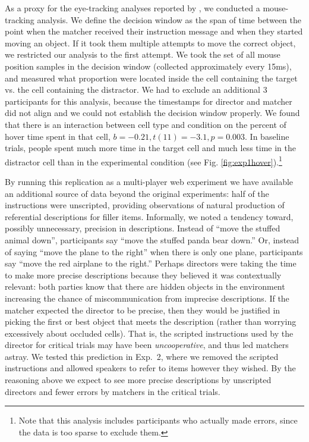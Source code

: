 \documentclass[10pt,letterpaper]{article}
\begin{document}
As a proxy for the eye-tracking analyses reported by , we conducted a mouse-tracking analysis. We define the decision window as the span of time between the point when the matcher received their instruction message and when they started moving an object. If it took them multiple attempts to move the correct object, we restricted our analysis to the first attempt. We took the set of all mouse position samples in the decision window (collected approximately every 15ms), and measured what proportion were located inside the cell containing the target vs. the cell containing the distractor.  We had to exclude an additional 3 participants for this analysis, because the timestamps for director and matcher did not align and we could not establish the decision window properly.
We found that there is an interaction between cell type and condition on the percent of hover time spent in that cell, $b = -0.21, t(11) = -3.1, p = 0.003$. In baseline trials, people spent much more time in the target cell and much less time in the distractor cell than in the experimental condition (see Fig. \ref{fig:exp1hover}).\footnote{Note that this analysis includes participants who actually made errors, since the data is too sparse to exclude them.} %

By running this replication as a multi-player web experiment we have available an additional source of data beyond the original experiments: half of the instructions were unscripted, providing observations of natural production of referential descriptions for filler items. 
Informally, we noted a tendency toward, possibly unnecessary, precision in descriptions. Instead of ``move the stuffed animal down'', participants say ``move the stuffed panda bear down.'' Or, instead of saying ``move the plane to the right'' when there is only one plane, participants say ``move the red airplane to the right.'' 
Perhaps directors were taking the time to make more precise descriptions because they believed it was contextually relevant: both parties know that there are hidden objects in the environment increasing the chance of miscommunication from imprecise descriptions. 
If the matcher expected the director to be precise, then they would be justified in picking the first or best object that meets the description (rather than worrying excessively about occluded cells). 
That is, the scripted instructions used by the director for critical trials may have been \emph{uncooperative}, and thus led matchers astray. 
We tested this prediction in Exp.~2, where we removed the scripted instructions and allowed speakers to refer to items however they wished.
By the reasoning above we expect to see more precise descriptions by unscripted directors and fewer errors by matchers in the critical trials.
\end{document}
